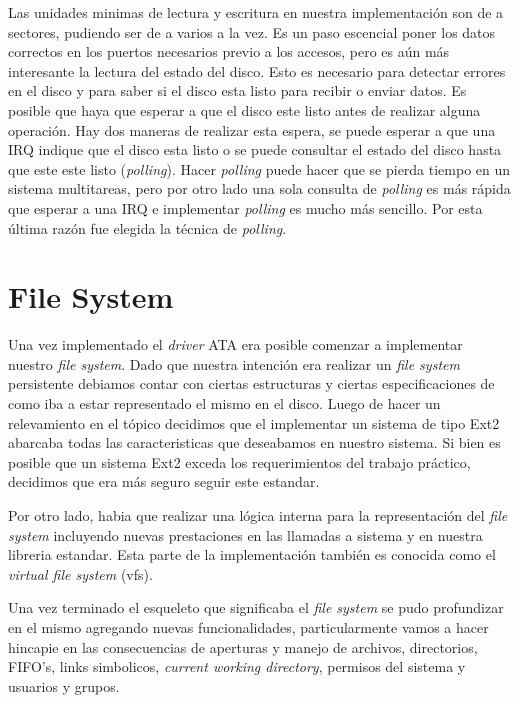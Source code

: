 \documentclass[a4paper,10pt]{article}
\begin{document}
    Las unidades minimas de lectura y escritura en nuestra implementación son de a sectores, pudiendo ser de a
    varios a la vez. Es un paso escencial poner los datos correctos en los puertos necesarios previo a los accesos, pero
    es aún más interesante la lectura del estado del disco. Esto es necesario para detectar errores en el disco
    y para saber si el disco esta listo para recibir o enviar datos. Es posible que haya que esperar a que el disco
    este listo antes de realizar alguna operación. Hay dos maneras de realizar esta espera, se puede esperar a que una IRQ
    indique que el disco esta listo o se puede consultar el estado del disco hasta que este este listo (\textit{polling}).
    Hacer \textit{polling} puede hacer que se pierda tiempo en un sistema multitareas, pero por otro lado una sola
    consulta de \textit{polling} es más rápida que esperar a una IRQ e implementar \textit{polling} es mucho más sencillo.
    Por esta última razón fue elegida la técnica de \textit{polling}.
\newpage
\section{File System}
    
    Una vez implementado el \textit{driver} ATA era posible comenzar a implementar nuestro \textit{file system}.
    Dado que nuestra intención era realizar un \textit{file system} persistente debiamos contar con ciertas estructuras
    y ciertas especificaciones de como iba a estar representado el mismo en el disco. Luego de hacer un relevamiento
    en el tópico decidimos que el implementar un sistema de tipo Ext2 abarcaba todas las caracteristicas que deseabamos
    en nuestro sistema. Si bien es posible que un sistema Ext2 exceda los requerimientos del trabajo práctico, decidimos
    que era más seguro seguir este estandar.
    
    Por otro lado, habia que realizar una lógica interna para la representación del \textit{file system}
    incluyendo nuevas prestaciones en las llamadas a sistema y en nuestra libreria estandar. Esta parte de la 
    implementación también es conocida como el \textit{virtual file system} (vfs).

    Una vez terminado el esqueleto que significaba el \textit{file system} se pudo profundizar en el mismo agregando
    nuevas funcionalidades, particularmente vamos a hacer hincapie en las consecuencias de aperturas y manejo de
    archivos, directorios, FIFO's, links simbolicos, \textit{current working
    directory}, permisos del sistema y usuarios y grupos.
\end{document}
